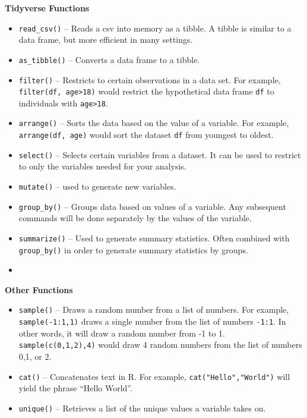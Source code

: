 \documentclass[
]{book}
\begin{document}
\textbf{Tidyverse Functions}

\begin{itemize}
\item
  \texttt{read\_csv()} -- Reads a csv into memory as a tibble. A tibble is similar to a data frame, but more efficient in many settings.
\item
  \texttt{as\_tibble()} -- Converts a data frame to a tibble.
\item
  \texttt{filter()} -- Restricts to certain observations in a data set. For example, \texttt{filter(df,\ age\textgreater{}18)} would restrict the hypothetical data frame \texttt{df} to individuals with \texttt{age\textgreater{}18}.
\item
  \texttt{arrange()} -- Sorts the data based on the value of a variable. For example, \texttt{arrange(df,\ age)} would sort the dataset \texttt{df} from youngest to oldest.
\item
  \texttt{select()} -- Selects certain variables from a dataset. It can be used to restrict to only the variables needed for your analysis.
\item
  \texttt{mutate()} -- used to generate new variables.
\item
  \texttt{group\_by()} -- Groups data based on values of a variable. Any subsequent commands will be done separately by the values of the variable.
\item
  \texttt{summarize()} -- Used to generate summary statistics. Often combined with \texttt{group\_by()} in order to generate summary statistics by groups.
\item
\end{itemize}

\textbf{Other Functions}

\begin{itemize}
\item
  \texttt{sample()} -- Draws a random number from a list of numbers. For example, \texttt{sample(-1:1,1)} draws a single number from the list of numbers \texttt{-1:1}. In other words, it will draw a random number from -1 to 1. \texttt{sample(c(0,1,2),4)} would draw 4 random numbers from the list of numbers 0,1, or 2.
\item
  \texttt{cat()} -- Concatenates text in R. For example, \texttt{cat("Hello","World")} will yield the phrase ``Hello World''.
\item
  \texttt{unique()} -- Retrieves a list of the unique values a variable takes on.
\end{itemize}
\end{document}
